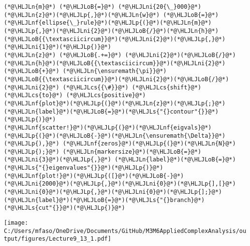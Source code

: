 \documentclass[12pt,landscape]{article}
\newcommand{\HLJLn}[1]{#1}
\newcommand{\HLJLnf}[1]{\textcolor[RGB]{66,102,213}{#1}}
\newcommand{\HLJLs}[1]{\textcolor[RGB]{201,61,57}{#1}}
\newcommand{\HLJLni}[1]{\textcolor[RGB]{59,151,46}{#1}}
\newcommand{\HLJLoB}[1]{\textcolor[RGB]{102,102,102}{\textbf{#1}}}
\newcommand{\HLJLp}[1]{#1}
\newcommand{\HLJLcs}[1]{\textcolor[RGB]{153,153,119}{\textit{#1}}}
\def\cent#1{\begin{center}#1\end{center} }
\begin{document}
{\begin{lstlisting}
(*@\HLJLn{m}@*) (*@\HLJLoB{=}@*) (*@\HLJLni{20{\_}000}@*)
(*@\HLJLn{z}@*)(*@\HLJLp{,}@*)(*@\HLJLn{w}@*) (*@\HLJLoB{=}@*) (*@\HLJLnf{ellipse{\_}rule}@*)(*@\HLJLp{(}@*)(*@\HLJLn{m}@*)(*@\HLJLp{,}@*)(*@\HLJLni{2}@*)(*@\HLJLoB{/}@*)(*@\HLJLn{h}@*)(*@\HLJLoB{{\textasciicircum}}@*)(*@\HLJLni{2}@*)(*@\HLJLp{,}@*)(*@\HLJLni{1}@*)(*@\HLJLp{)}@*)
(*@\HLJLn{z}@*) (*@\HLJLoB{.+=}@*) (*@\HLJLni{2}@*)(*@\HLJLoB{/}@*)(*@\HLJLn{h}@*)(*@\HLJLoB{{\textasciicircum}}@*)(*@\HLJLni{2}@*) (*@\HLJLoB{+}@*) (*@\HLJLn{\ensuremath{\pi}}@*)(*@\HLJLoB{{\textasciicircum}}@*)(*@\HLJLni{2}@*)(*@\HLJLoB{/}@*)(*@\HLJLni{2}@*) (*@\HLJLcs{{\#}}@*) (*@\HLJLcs{shift}@*) (*@\HLJLcs{to}@*) (*@\HLJLcs{positive}@*)
(*@\HLJLnf{plot}@*)(*@\HLJLp{(}@*)(*@\HLJLn{z}@*)(*@\HLJLp{;}@*) (*@\HLJLn{label}@*)(*@\HLJLoB{=}@*)(*@\HLJLs{"{}contour"{}}@*)(*@\HLJLp{)}@*)
(*@\HLJLnf{scatter!}@*)(*@\HLJLp{(}@*)(*@\HLJLnf{eigvals}@*)(*@\HLJLp{(}@*)(*@\HLJLoB{-}@*)(*@\HLJLn{\ensuremath{\Delta}}@*)(*@\HLJLp{),}@*) (*@\HLJLnf{zeros}@*)(*@\HLJLp{(}@*)(*@\HLJLn{N}@*)(*@\HLJLp{);}@*) (*@\HLJLn{markersize}@*)(*@\HLJLoB{=}@*)(*@\HLJLni{3}@*)(*@\HLJLp{,}@*) (*@\HLJLn{label}@*)(*@\HLJLoB{=}@*)(*@\HLJLs{"{}eigenvalues"{}}@*)(*@\HLJLp{)}@*)
(*@\HLJLnf{plot!}@*)(*@\HLJLp{([}@*)(*@\HLJLoB{-}@*)(*@\HLJLni{2000}@*)(*@\HLJLp{,}@*)(*@\HLJLni{0}@*)(*@\HLJLp{],[}@*)(*@\HLJLni{0}@*)(*@\HLJLp{,}@*)(*@\HLJLni{0}@*)(*@\HLJLp{];}@*) (*@\HLJLn{label}@*)(*@\HLJLoB{=}@*)(*@\HLJLs{"{}branch}@*) (*@\HLJLs{cut"{}}@*)(*@\HLJLp{)}@*)
\end{lstlisting}

\cent{\texttt{[image: C:/Users/mfaso/OneDrive/Documents/GitHub/M3M6AppliedComplexAnalysis/output/figures/Lecture9\_13\_1.pdf]}}

}
\end{document}
